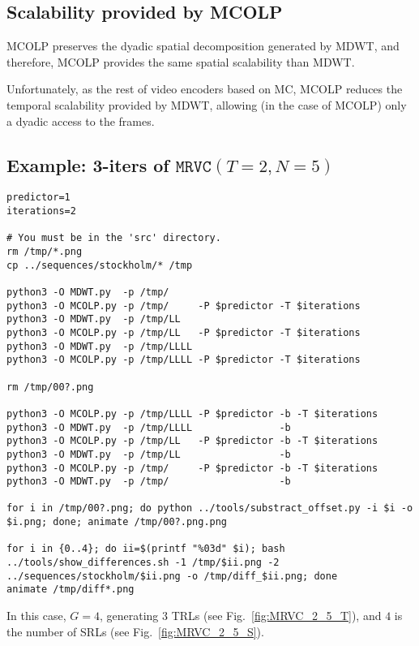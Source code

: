
\subsection{Scalability provided by MCOLP}

MCOLP preserves the dyadic spatial decomposition generated by MDWT,
and therefore, MCOLP provides the same spatial scalability than MDWT.

Unfortunately, as the rest of video encoders based on MC, MCOLP
reduces the temporal scalability provided by MDWT, allowing (in the
case of MCOLP) only a dyadic access to the frames.


\subsection{Example: 3-iters of $\mathtt{MRVC}(T=2, N=5)$}

\begin{verbatim}
predictor=1
iterations=2

# You must be in the 'src' directory.
rm /tmp/*.png
cp ../sequences/stockholm/* /tmp

python3 -O MDWT.py  -p /tmp/
python3 -O MCOLP.py -p /tmp/     -P $predictor -T $iterations
python3 -O MDWT.py  -p /tmp/LL
python3 -O MCOLP.py -p /tmp/LL   -P $predictor -T $iterations
python3 -O MDWT.py  -p /tmp/LLLL
python3 -O MCOLP.py -p /tmp/LLLL -P $predictor -T $iterations

rm /tmp/00?.png

python3 -O MCOLP.py -p /tmp/LLLL -P $predictor -b -T $iterations
python3 -O MDWT.py  -p /tmp/LLLL               -b
python3 -O MCOLP.py -p /tmp/LL   -P $predictor -b -T $iterations
python3 -O MDWT.py  -p /tmp/LL                 -b
python3 -O MCOLP.py -p /tmp/     -P $predictor -b -T $iterations
python3 -O MDWT.py  -p /tmp/                   -b

for i in /tmp/00?.png; do python ../tools/substract_offset.py -i $i -o $i.png; done; animate /tmp/00?.png.png

for i in {0..4}; do ii=$(printf "%03d" $i); bash ../tools/show_differences.sh -1 /tmp/$ii.png -2 ../sequences/stockholm/$ii.png -o /tmp/diff_$ii.png; done
animate /tmp/diff*.png
\end{verbatim}

In this case, $G=4$, generating $3$ TRLs (see
Fig.~\ref{fig:MRVC_2_5_T}), and $4$ is the number of SRLs (see
Fig.~\ref{fig:MRVC_2_5_S}).

